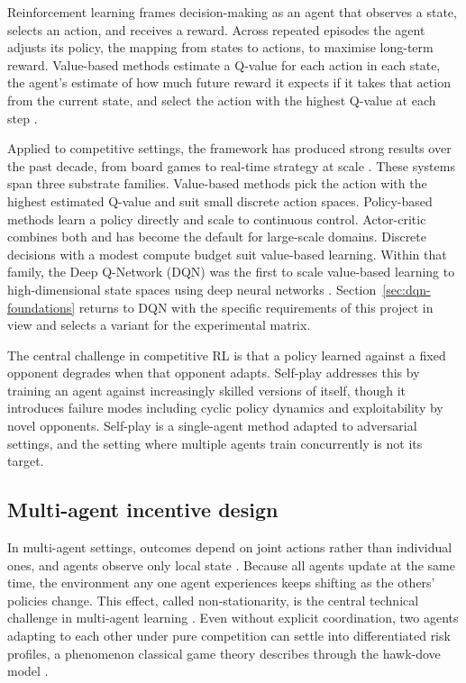 Reinforcement learning frames decision-making as an agent that observes a state, selects an action, and receives a reward. Across repeated episodes the agent adjusts its policy, the mapping from states to actions, to maximise long-term reward. Value-based methods estimate a Q-value for each action in each state, the agent's estimate of how much future reward it expects if it takes that action from the current state, and select the action with the highest Q-value at each step \citep{mnih2015human}.

Applied to competitive settings, the framework has produced strong results over the past decade, from board games \citep{silver2018alphazero} to real-time strategy at scale \citep{berner2019dota2, vinyals2019alphastar}. These systems span three substrate families. Value-based methods pick the action with the highest estimated Q-value and suit small discrete action spaces. Policy-based methods learn a policy directly and scale to continuous control. Actor-critic combines both and has become the default for large-scale domains. Discrete decisions with a modest compute budget suit value-based learning. Within that family, the Deep Q-Network (DQN) was the first to scale value-based learning to high-dimensional state spaces using deep neural networks \citep{mnih2015human}. Section~\ref{sec:dqn-foundations} returns to DQN with the specific requirements of this project in view and selects a variant for the experimental matrix.


The central challenge in competitive RL is that a policy learned against a fixed opponent degrades when that opponent adapts. Self-play addresses this by training an agent against increasingly skilled versions of itself, though it introduces failure modes including cyclic policy dynamics and exploitability by novel opponents. Self-play is a single-agent method adapted to adversarial settings, and the setting where multiple agents train concurrently is not its target.

\subsection{Multi-agent incentive design}

In multi-agent settings, outcomes depend on joint actions rather than individual ones, and agents observe only local state \citep{busoniu2008survey}. Because all agents update at the same time, the environment any one agent experiences keeps shifting as the others' policies change. This effect, called non-stationarity, is the central technical challenge in multi-agent learning \citep{hernandezleal2019survey}. Even without explicit coordination, two agents adapting to each other under pure competition can settle into differentiated risk profiles, a phenomenon classical game theory describes through the hawk-dove model \citep{maynardsmith1973hawkdove}.

